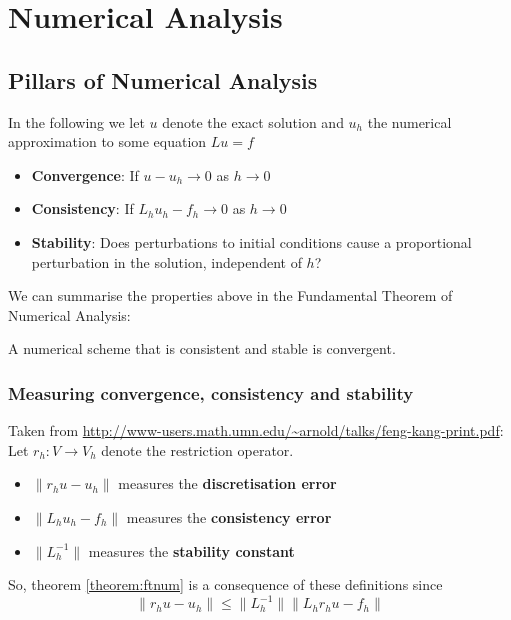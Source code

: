 \chapter{Numerical Analysis}

\section{Pillars of Numerical Analysis}

In the following we let $u$ denote the exact solution and $u_h$ the numerical approximation to
some equation $L u = f$

\begin{itemize}
\item \textbf{Convergence}: If $u - u_h \rightarrow 0$ as $h\rightarrow 0$
\item \textbf{Consistency}: If $L_h u_h - f_h \rightarrow 0$ as $h\rightarrow 0$
\item \textbf{Stability}: Does perturbations to initial conditions cause a 
    proportional perturbation in the solution, independent of $h$?
\end{itemize}

We can summarise the properties above in the Fundamental Theorem of Numerical Analysis:
\begin{theorem}\label{theorem:ftnum}
A numerical scheme that is consistent and stable is convergent.
\end{theorem}

\subsection{Measuring convergence, consistency and stability}

Taken from \url{http://www-users.math.umn.edu/~arnold/talks/feng-kang-print.pdf}:
Let $r_h : V \rightarrow V_h$ denote the restriction operator.

\begin{itemize}
\item $\| r_h u - u_h \|$ measures the \textbf{discretisation error}
\item $\| L_h u_h - f_h \|$ measures the \textbf{consistency error}
\item $\| L_h^{-1}\|$ measures the \textbf{stability constant}
\end{itemize}

So, theorem \ref{theorem:ftnum} is a consequence of these definitions since
\[
\| r_h u - u_h \|\leq \| L_h^{-1}\|\| L_h r_h u - f_h \|
\]

